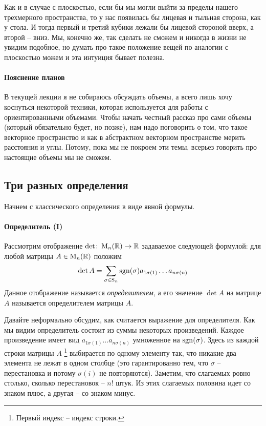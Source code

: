 Как и в случае с плоскостью, если бы мы могли выйти за пределы нашего трехмерного пространства, то у нас появилась бы лицевая и тыльная сторона, как у стола.
И тогда первый и третий кубики лежали бы лицевой стороной вверх, а второй -- вниз.
Мы, конечно же, так сделать не сможем и никогда в жизни не увидим подобное, но думать про такое положение вещей по аналогии с плоскостью можем и эта интуиция бывает полезна.

\paragraph{Пояснение планов}

В текущей лекции я не собираюсь обсуждать объемы, а всего лишь хочу коснуться некоторой техники, которая используется для работы с ориентированными объемами.
Чтобы начать честный рассказ про сами объемы (который обязательно будет, но позже), нам надо поговорить о том, что такое векторное пространство и как в абстрактном векторном пространстве мерить расстояния и углы.
Потому, пока мы не покроем эти темы, всерьез говорить про настоящие объемы мы не сможем.

\subsection{Три разных определения}

Начнем с классического определения в виде явной формулы.

\paragraph{Определитель (I)}

Рассмотрим отображение $\det \colon \operatorname{M}_{n}(\mathbb R)\to \mathbb R$ задаваемое следующей формулой: для любой матрицы $A\in\operatorname{M}_{n}(\mathbb R)$ положим
\[
\det A = \sum_{\sigma \in \operatorname{S}_{n}} \operatorname{sgn}(\sigma) a_{1\sigma(1)}\ldots a_{n\sigma(n)}
\]
Данное отображение называется {\it определителем}, а его значение $\det A$ на матрице $A$ называется определителем матрицы $A$.

Давайте неформально обсудим, как считается выражение для определителя.
Как мы видим определитель состоит из суммы некоторых произведений.
Каждое произведение имеет вид $a_{1\sigma(1)}\ldots a_{n\sigma(n)}$ умноженное на $\operatorname{sgn}(\sigma)$.
Здесь из каждой строки матрицы $A$%
\footnote{Первый индекс -- индекс строки.}
выбирается по одному элементу так, что никакие два элемента не лежат в одном столбце (это гарантированно тем, что $\sigma$ -- перестановка и потому $\sigma(i)$ не повторяются).
Заметим, что слагаемых ровно столько, сколько перестановок -- $n!$ штук.
Из этих слагаемых половина идет со знаком плюс, а другая -- со знаком минус.

